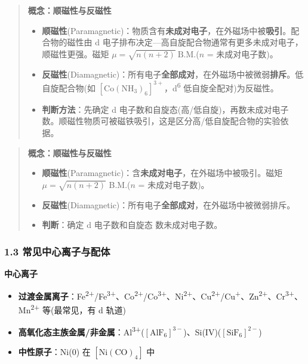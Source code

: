 \begin{quote}
\textbf{概念：顺磁性与反磁性}

\begin{itemize}
\tightlist
\item
  \textbf{顺磁性}(Paramagnetic)：物质含有\textbf{未成对电子}，在外磁场中被\textbf{吸引}。配合物的磁性由 d 电子排布决定---高自旋配合物通常有更多未成对电子，顺磁性更强。磁矩 \(\mu = \sqrt{n(n+2)}\ \mathrm{B.M.}\)(\(n\) = 未成对电子数)。
\item
  \textbf{反磁性}(Diamagnetic)：所有电子\textbf{全部成对}，在外磁场中被微弱\textbf{排斥}。低自旋配合物(如 \([\mathrm{Co(NH_3)_6}]^{3+}\)，d\textsuperscript{6} 低自旋全配对)为反磁性。
\item
  \textbf{判断方法}：先确定 d 电子数和自旋态(高/低自旋)，再数未成对电子数。顺磁性物质可被磁铁吸引，这是区分高/低自旋配合物的实验依据。
\end{itemize}
\end{quote}

\begin{quote}
\textbf{概念：顺磁性与反磁性}

\begin{itemize}
\tightlist
\item
  \textbf{顺磁性}(Paramagnetic)：含\textbf{未成对电子}，在外磁场中被吸引。磁矩 \(\mu = \sqrt{n(n+2)}\) B.M.(\(n\) = 未成对电子数)。
\item
  \textbf{反磁性}(Diamagnetic)：所有电子\textbf{全部成对}，在外磁场中被微弱排斥。
\item
  \textbf{判断}：确定 d 电子数和自旋态 \箭 数未成对电子数。
\end{itemize}
\end{quote}

\subsubsection{1.3 常见中心离子与配体}\label{ux5e38ux89c1ux4e2dux5fc3ux79bbux5b50ux4e0eux914dux4f53}

\textbf{中心离子}

\begin{itemize}
\tightlist
\item
  \textbf{过渡金属离子}：Fe\textsuperscript{2+}/Fe\textsuperscript{3+}、Co\textsuperscript{2+}/Co\textsuperscript{3+}、Ni\textsuperscript{2+}、Cu\textsuperscript{2+}/Cu\textsuperscript{+}、Zn\textsuperscript{2+}、Cr\textsuperscript{3+}、Mn\textsuperscript{2+} 等(最常见，有 d 轨道)
\item
  \textbf{高氧化态主族金属/非金属}：Al\textsuperscript{3+}(\([\mathrm{AlF_6}]^{3-}\))、Si(IV)(\([\mathrm{SiF_6}]^{2-}\))
\item
  \textbf{中性原子}：Ni(0) 在 \([\mathrm{Ni(CO)_4}]\) 中
\end{itemize}

